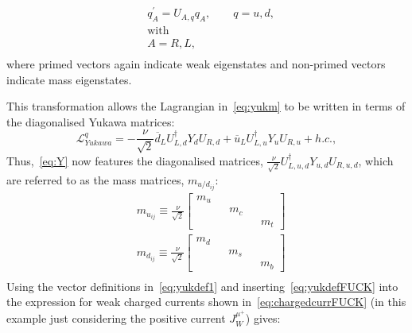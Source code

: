 \begin{equation}
  \begin{split}
    &
    q^{\prime}_{A} = U_{A,q}q_{A}, \qquad q = u,d,\\
&  \mathrm{with}\\
  &  A = R,L,\\
  \end{split}
  \label{eq:yukdefFUCK}
\end{equation}
where primed vectors again indicate weak eigenstates and non-primed vectors indicate mass eigenstates.

This transformation allows the Lagrangian in~\autoref{eq:yukm} to be written in terms of the diagonalised Yukawa matrices:
\begin{equation}
  \mathcal{L}^{q}_{Yukawa} = -\frac{\nu}{\sqrt{2}}{\overline{d}_{L}U^{\dagger}_{L,d}Y_{d}U_{R,d} + \overline{u}_{L}U^{\dagger}_{L,u}Y_{u}U_{R,u} + h.c.},
  \label{eq:Y}
\end{equation}
Thus,~\autoref{eq:Y} now features the diagonalised matrices, $\frac{\nu}{\sqrt{2}}U^{\dagger}_{L,u,d}Y_{u,d}U_{R,u,d}$, which are referred to as the mass matrices, $m_{u/d_{ij}}$:
\begin{equation}
  \begin{split}
    &
    m_{u_{ij}} \equiv \frac{\nu}{\sqrt{2}}\begin{bmatrix}m_{u}&& && \\ &&m_{c}&& \\ && &&m_{t}\end{bmatrix} \\
    &
    m_{d_{ij}} \equiv \frac{\nu}{\sqrt{2}}\begin{bmatrix}m_{d}&& && \\ &&m_{s}&& \\ && &&m_{b}\end{bmatrix}\\
  \end{split}
  \label{eq:W}
\end{equation}
Using the vector definitions in~\autoref{eq:yukdef1} and inserting~\autoref{eq:yukdefFUCK} into the expression for weak charged currents shown in~\autoref{eq:chargedcurrFUCK} (in this example just considering the positive current $J^{\mu^{+}}_{W}$) gives:
